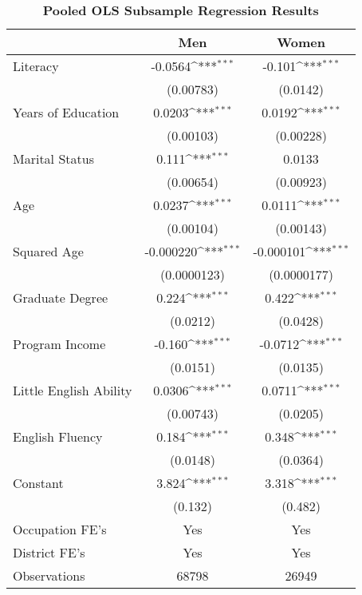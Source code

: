 \begin{table}[htbp]\centering
\def\sym#1{\ifmmode^{#1}\else\(^{#1}\)\fi}
\caption{\textbf{Pooled OLS Subsample Regression Results}}
\begin{tabular}{l*{2}{c}}
\hline\hline
                &\multicolumn{1}{c}{Men}&\multicolumn{1}{c}{Women}\\
\hline
Literacy        &  -0.0564\sym{***}&   -0.101\sym{***}\\
                &(0.00783)         & (0.0142)         \\
[1em]
Years of Education&   0.0203\sym{***}&   0.0192\sym{***}\\
                &(0.00103)         &(0.00228)         \\
[1em]
Marital Status  &    0.111\sym{***}&   0.0133         \\
                &(0.00654)         &(0.00923)         \\
[1em]
Age             &   0.0237\sym{***}&   0.0111\sym{***}\\
                &(0.00104)         &(0.00143)         \\
[1em]
Squared Age     &-0.000220\sym{***}&-0.000101\sym{***}\\
                &(0.0000123)         &(0.0000177)         \\
[1em]
Graduate Degree &    0.224\sym{***}&    0.422\sym{***}\\
                & (0.0212)         & (0.0428)         \\
[1em]
Program Income  &   -0.160\sym{***}&  -0.0712\sym{***}\\
                & (0.0151)         & (0.0135)         \\
[1em]
Little English Ability&   0.0306\sym{***}&   0.0711\sym{***}\\
                &(0.00743)         & (0.0205)         \\
[1em]
English Fluency &    0.184\sym{***}&    0.348\sym{***}\\
                & (0.0148)         & (0.0364)         \\
[1em]
Constant        &    3.824\sym{***}&    3.318\sym{***}\\
                &  (0.132)         &  (0.482)         \\
[1em]
Occupation FE's &      Yes         &      Yes         \\
[1em]
District FE's   &      Yes         &      Yes         \\
\hline
Observations    &    68798         &    26949         \\

\end{tabular}
\end{table}
